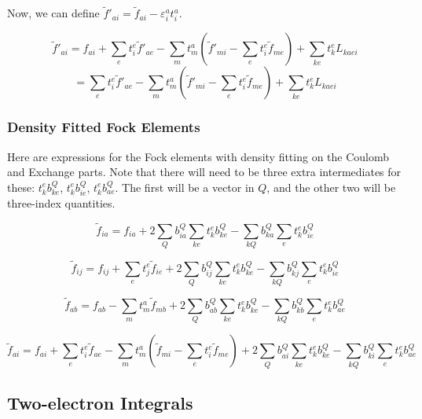 \documentclass{article}
\begin{document}
Now, we can define $\tilde{f}'_{ai} = \tilde{f}_{ai} - \varepsilon_i^at_i^a$.

\begin{equation}
  \tilde{f}'_{ai} = f_{ai} + \sum_et_i^e\tilde{f}'_{ae} - \sum_mt_m^a\left(\tilde{f}'_{mi} -\sum_et_i^e\tilde{f}_{me}\right) + \sum_{ke}t_k^eL_{kaei}
\end{equation}
\begin{equation}
  = \sum_et_i^e\tilde{f}'_{ae} - \sum_mt_m^a\left(\tilde{f}'_{mi} - \sum_et_i^e\tilde{f}_{me}\right) + \sum_{ke}t_k^eL_{kaei}
\end{equation}

\subsubsection{Density Fitted Fock Elements}

Here are expressions for the Fock elements with density fitting on the Coulomb and Exchange parts. Note that there will need to be three extra intermediates for these: $t_k^eb_{ke}^Q$, $t_k^eb_{ie}^Q$, $t_k^eb_{ae}^Q$. The first will be a vector in $Q$, and the other two will be three-index quantities.

\begin{equation}
  \tilde{f}_{ia} = f_{ia} + 2\sum_Qb_{ia}^Q\sum_{ke}t_k^eb_{ke}^Q - \sum_{kQ}b_{ka}^Q\sum_{e}t_k^eb_{ie}^Q
\end{equation}

\begin{equation}
  \tilde{f}_{ij} = f_{ij} + \sum_e t_j^e\tilde{f}_{ie} + 2\sum_Qb_{ij}^Q\sum_{ke}t_k^eb_{ke}^Q - \sum_{kQ}b_{kj}^Q\sum_{e}t_k^eb_{ie}^Q
\end{equation}

\begin{equation}
  \tilde{f}_{ab} = f_{ab} - \sum_mt_m^a\tilde{f}_{mb} + 2\sum_Qb_{ab}^Q\sum_{ke}t_k^eb_{ke}^Q - \sum_{kQ}b_{kb}^Q\sum_{e}t_k^eb_{ae}^Q
\end{equation}

\begin{equation}
  \tilde{f}_{ai} = f_{ai} + \sum_et_i^e\tilde{f}_{ae} - \sum_mt_m^a\left(\tilde{f}_{mi} - \sum_et_i^e\tilde{f}_{me}\right) + 2\sum_Qb_{ai}^Q\sum_{ke}t_k^eb_{ke}^Q - \sum_{kQ}b_{ki}^Q\sum_{e}t_k^eb_{ae}^Q
\end{equation}

\subsection{Two-electron Integrals}
\end{document}
